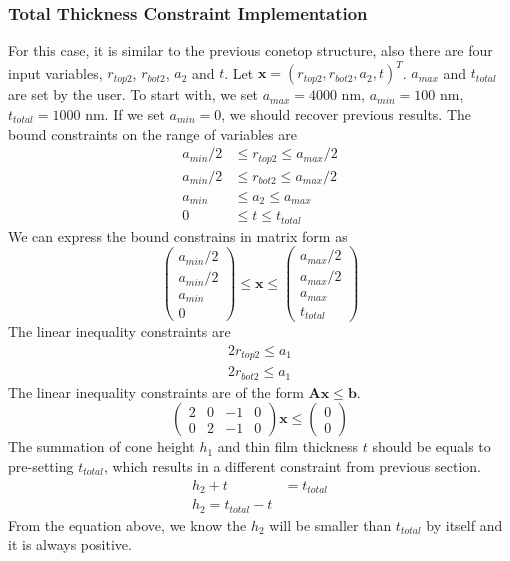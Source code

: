 \documentclass[12pt]{article}
\numberwithin{equation}{section}
\numberwithin{equation}{section}
\begin{document}
\subsubsection{Total Thickness Constraint Implementation}
For this case, it is similar to the previous conetop structure, also there are four input variables, $r_{top2}$, $r_{bot2}$, $a_2$ and $t$.
Let $\mathbf{x} = \left ( r_{top2}, r_{bot2}, a_2, t  \right )^T $.
$a_{max}$ and $t_{total}$ are set by the user.  To start with, we set $a_{max} = 4000$ nm, $a_{min} = 100$ nm, $t_{total} = 1000$ nm.  If we set $a_{min} = 0$, we should recover previous results.
The bound constraints on the range of variables are
\begin{align*}
a_{min}/2 & \leq r_{top2} \leq a_{max}/2 \\
a_{min}/2 & \leq r_{bot2} \leq a_{max}/2 \\
a_{min} & \leq a_{2} \leq a_{max} \\
0 & \leq t \leq t_{total}
\end{align*}
We can express the bound constrains in matrix form as
\begin{equation}
\left(
\begin{matrix}
a_{min}/2\\ 
a_{min}/2\\
a_{min}\\ 
0 
\end{matrix} \right )
\leq \mathbf{x}
 \leq 
 \left(
\begin{matrix}
a_{max}/2 \\ a_{max}/2 \\ a_{max} \\  t_{total}
\end{matrix} \right )
\end{equation}
The linear inequality constraints are 
\begin{align*}   
2r_{top2} \leq a_1 \\
2r_{bot2} \leq a_1 
\end{align*}
The linear inequality constraints are of the form $\mathbf{A} \mathbf{x} \leq \mathbf{b}$.
\begin{equation}
\left(
\begin{matrix}
2 & 0 & -1 & 0  \\
0 & 2 & -1 & 0 
\end{matrix}
\right ) \mathbf{x}  \leq \left ( \begin{matrix} 0\\ 0 \end{matrix} \right ) 
\end{equation}
The summation of cone height $h_1$ and thin film thickness $t$ should be equals to pre-setting $t_{total}$, which results in a different constraint from previous section.
\begin{align}
 h_{2} + t &= t_{total} \nonumber \\
 h_{2} = t_{total}-t 
 \end{align}
From the equation above, we know the $h_2$ will be smaller than $t_{total}$ by itself and it is always positive. \\
\end{document}
